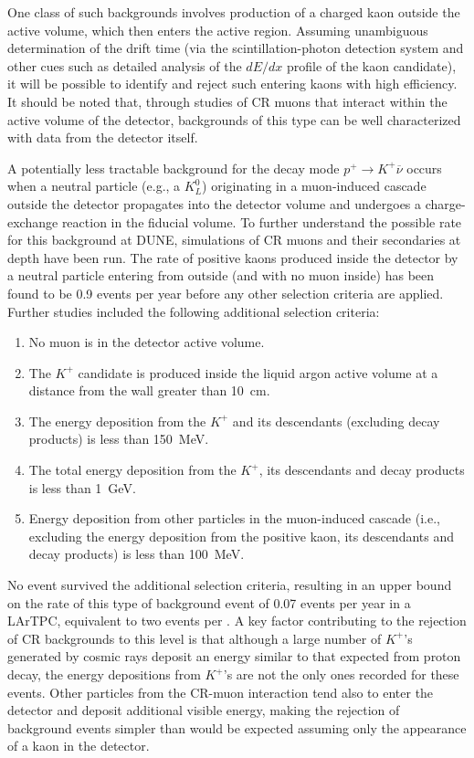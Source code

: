 One class of such backgrounds involves production of a charged kaon 
outside the active volume, which then enters the active region.  
Assuming unambiguous determination of the drift time (via the 
scintillation-photon detection system and other cues such as 
detailed analysis of the $dE/dx$ profile of the kaon candidate), 
it will be possible to identify and reject such entering kaons 
with high efficiency.  It should be noted that, through studies 
of CR muons that interact within the active volume of the 
detector, backgrounds of this type can be well characterized 
with data from the detector itself.

A potentially less tractable background 
for the decay mode $p^+ \rightarrow K^+\overline{\nu}$
occurs when a neutral particle (e.g., a $K^0_L$) originating in a
muon-induced cascade outside the detector propagates into the detector
volume and undergoes a charge-exchange reaction in the fiducial
volume.  To further understand the possible rate for this background
at DUNE, simulations of CR muons and their secondaries at
depth have been run.  The rate of positive kaons produced inside the
 detector by a neutral particle entering from outside (and with
no muon inside) has been found to be 0.9 events per year before any other selection 
criteria are applied. Further studies included the following additional
selection criteria:
%
\begin{enumerate}
\item No muon is in the detector active volume.
\item The $K^+$ candidate is produced 
      inside the liquid argon active volume 
      at a distance from the wall greater than \SI{10}{\cm}. 
\item The energy deposition from the $K^+$ and its descendants 
        (excluding decay products) is less than \SI{150}{\MeV}. 
\item The total energy deposition from the $K^+$, its descendants
      and decay products is less than \SI{1}{\GeV}.
\item Energy deposition from other particles in the muon-induced 
      cascade (i.e., excluding the energy deposition
      from the positive kaon, its descendants and decay products) 
      is less than \SI{100}{\MeV}. 
\end{enumerate}

No event survived the additional selection criteria, resulting in an
upper bound on the rate of this type of background event of 0.07
events per year in a  LArTPC, equivalent to two events per 
 \SI{}{\Mtyr}.  A key factor contributing to the rejection of 
CR backgrounds to this level is that although a large number 
of $K^+$'s generated by cosmic rays deposit an 
energy similar to that expected from proton decay, the
energy depositions from $K^+$'s are not the only ones recorded for
these events.  Other particles from the CR-muon interaction 
tend also to enter the detector and deposit additional visible
energy, making the rejection of background events simpler than
would be expected assuming only the appearance of a kaon in the detector.

